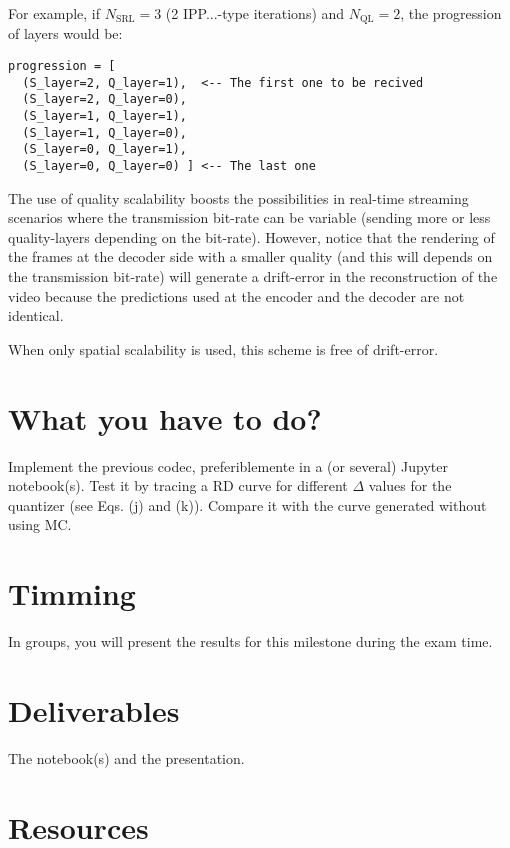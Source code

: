 For example, if $N_{\text{SRL}}=3$ (2 IPP...-type iterations) and
$N_{\text{QL}}=2$, the progression of layers would be:
\begin{verbatim}
progression = [
  (S_layer=2, Q_layer=1),  <-- The first one to be recived
  (S_layer=2, Q_layer=0),
  (S_layer=1, Q_layer=1),
  (S_layer=1, Q_layer=0),
  (S_layer=0, Q_layer=1),
  (S_layer=0, Q_layer=0) ] <-- The last one
\end{verbatim}

The use of quality scalability boosts the possibilities in real-time
streaming scenarios where the transmission bit-rate can be variable
(sending more or less quality-layers depending on the
bit-rate). However, notice that the rendering of the
frames at the decoder side with a smaller quality (and this will
depends on the transmission bit-rate) will generate a drift-error in
the reconstruction of the video because the predictions used at the
encoder and the decoder are not identical.

When only spatial scalability is used, this scheme is free of
drift-error.

\section{What you have to do?}

Implement the previous codec, preferiblemente in a (or several)
Jupyter notebook(s). Test it by tracing a RD curve for different
$\Delta$ values for the quantizer (see Eqs. (j) and (k)). Compare it
with the curve generated without using MC.

\section{Timming}

In groups, you will present the results for this milestone during the
exam time.

\section{Deliverables}

The notebook(s) and the presentation.

\section{Resources}

\renewcommand{\addcontentsline}[3]{}%

